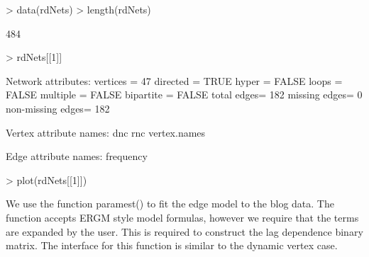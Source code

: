 \documentclass[12pt]{article}
\begin{document}
\begin{Schunk}
\begin{Sinput}
> data(rdNets)
> length(rdNets)
\end{Sinput}
\begin{Soutput}
[1] 484
\end{Soutput}
\begin{Sinput}
> rdNets[[1]]
\end{Sinput}
\begin{Soutput}
 Network attributes:
  vertices = 47 
  directed = TRUE 
  hyper = FALSE 
  loops = FALSE 
  multiple = FALSE 
  bipartite = FALSE 
  total edges= 182 
    missing edges= 0 
    non-missing edges= 182 

 Vertex attribute names: 
    dnc rnc vertex.names 

 Edge attribute names: 
    frequency 
\end{Soutput}
\begin{Sinput}
> plot(rdNets[[1]])
\end{Sinput}
\end{Schunk}

We use the function paramest() to fit the edge model to the blog data. The function accepts ERGM style model formulas, however we require that the terms are expanded by the user. This is required to construct the lag dependence binary matrix. The interface for this function is similar to the dynamic vertex case.
\end{document}
